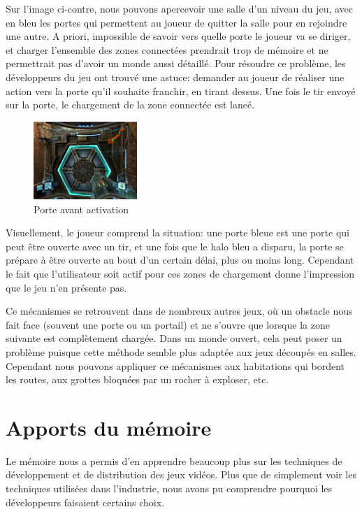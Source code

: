 \documentclass[a4paper, 12pt]{article} %
\begin{document}
Sur l'image ci-contre, nous pouvons apercevoir une salle d'un niveau du jeu, avec en bleu les portes qui permettent au joueur de quitter la salle pour en rejoindre une autre. A priori, impossible de savoir vers quelle porte le joueur va se diriger, et charger l'ensemble des zones connectées prendrait trop de mémoire et ne permettrait pas d'avoir un monde aussi détaillé. Pour résoudre ce problème, les développeurs du jeu ont trouvé une astuce: demander au joueur de réaliser une action vers la porte qu'il souhaite franchir, en tirant dessus. Une fois le tir envoyé sur la porte, le chargement de la zone connectée est lancé.

\begin{figure}
\begin{center}
\includegraphics[width=0.35\textwidth]{images/metroid-prime_door.png}
\end{center}
\caption{Porte avant activation}
\end{figure}
Visuellement, le joueur comprend la situation: une porte bleue est une porte qui peut être ouverte avec un tir, et une fois que le halo bleu a disparu, la porte se prépare à être ouverte au bout d'un certain délai, plus ou moins long. Cependant le fait que l'utilisateur soit actif pour ces zones de chargement donne l'impression que le jeu n'en présente pas.

Ce mécanismes se retrouvent dans de nombreux autres jeux, où un obstacle nous fait face (souvent une porte ou un portail) et ne s'ouvre que lorsque la zone suivante est complètement chargée.
Dans un monde ouvert, cela peut poser un problème puisque cette méthode semble plus adaptée aux jeux découpés en salles. Cependant nous pouvons appliquer ce mécanismes aux habitations qui bordent les routes, aux grottes bloquées par un rocher à exploser, etc.


\newpage
\section{Apports du mémoire}
Le mémoire nous a permis d'en apprendre beaucoup plus sur les techniques de développement et de distribution des jeux vidéos. Plus que de simplement voir les techniques utilisées dans l'industrie, nous avons pu comprendre pourquoi les développeurs faisaient certains choix.
\end{document}
